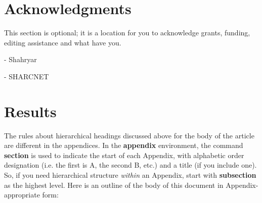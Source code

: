 \documentclass{sig-alternate}
\begin{document}
\begin{flushleft}\end{flushleft}



\section{Acknowledgments}
This section is optional; it is a location for you
to acknowledge grants, funding, editing assistance and
what have you.

- Shahryar

- SHARCNET


%

%
%

\appendix
\section{Results}
The rules about hierarchical headings discussed above for
the body of the article are different in the appendices.
In the \textbf{appendix} environment, the command
\textbf{section} is used to
indicate the start of each Appendix, with alphabetic order
designation (i.e. the first is A, the second B, etc.) and
a title (if you include one).  So, if you need
hierarchical structure
\textit{within} an Appendix, start with \textbf{subsection} as the
highest level. Here is an outline of the body of this
document in Appendix-appropriate form:
\end{document}
